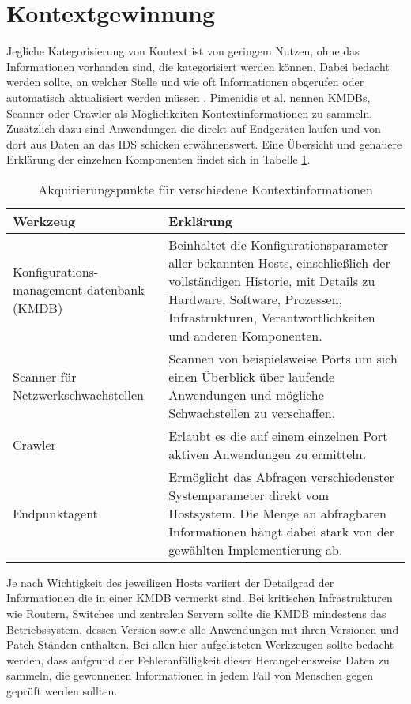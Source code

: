 \section{Kontextgewinnung}
Jegliche Kategorisierung von Kontext ist von geringem Nutzen, ohne das Informationen vorhanden sind, die kategorisiert werden können. Dabei bedacht werden sollte, an welcher Stelle und wie oft Informationen abgerufen oder automatisch aktualisiert werden müssen \cite{perera_context_2014}. Pimenidis et al. \cite{pimenidis2008context} nennen KMDBs, Scanner oder Crawler als Möglichkeiten Kontextinformationen zu sammeln. Zusätzlich dazu sind Anwendungen die direkt auf Endgeräten laufen und von dort aus Daten an das IDS schicken erwähnenswert. Eine Übersicht und genauere Erklärung der einzelnen Komponenten findet sich in Tabelle \ref{Tabelle_2}. 
\begin{table}[H]
\label{Tabelle_2}
\caption{Akquirierungspunkte für verschiedene Kontextinformationen}
\begin{tabularx}{\columnwidth}{p{3cm} p{10cm}}
\toprule
Werkzeug & Erklärung\\
\midrule
Konfigurations-management-datenbank (KMDB) & 
Beinhaltet die Konfigurationsparameter aller bekannten Hosts, einschließlich der vollständigen Historie, mit Details zu Hardware, Software, Prozessen, Infrastrukturen, Verantwortlichkeiten und anderen Komponenten.\\
\midrule
Scanner für Netzwerkschwachstellen &  Scannen von beispielsweise Ports um sich einen Überblick über laufende Anwendungen und mögliche Schwachstellen zu verschaffen. \\
\midrule
Crawler & Erlaubt es die auf einem einzelnen Port aktiven Anwendungen zu ermitteln.\\
\midrule
Endpunktagent & Ermöglicht das Abfragen verschiedenster Systemparameter direkt vom Hostsystem. Die Menge an abfragbaren Informationen hängt dabei stark von der gewählten Implementierung ab.\\
\bottomrule
\end{tabularx}
\end{table}
Je nach Wichtigkeit des jeweiligen Hosts variiert der Detailgrad der Informationen die in einer KMDB vermerkt sind. Bei kritischen Infrastrukturen wie Routern, Switches und zentralen Servern sollte die KMDB mindestens das Betriebssystem, dessen Version sowie alle Anwendungen mit ihren Versionen und Patch-Ständen enthalten. Bei allen hier aufgelisteten Werkzeugen sollte bedacht werden, dass aufgrund der Fehleranfälligkeit dieser Herangehensweise Daten zu sammeln, die gewonnenen Informationen in jedem Fall von Menschen gegen geprüft werden sollten.
